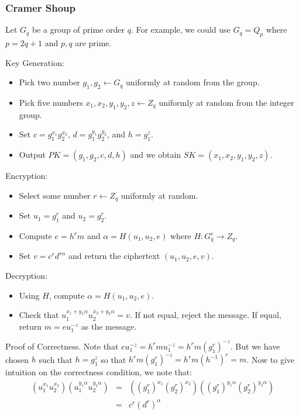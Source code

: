 \documentclass[psamsfonts]{amsart}
\begin{document}
\subsubsection{Cramer Shoup}

Let $G_q$ be a group of prime order $q$. For example, we could use $G_q = Q_p$ where $p = 2q+1$ and $p,q$ are prime.

Key Generation:
\begin{itemize}
  \item Pick two number $g_1, g_2 \leftarrow G_q$ uniformly at random from the group.
  \item Pick five numbers $x_1, x_2, y_1, y_2, z \leftarrow Z_q$ uniformly at random from the integer group.
  \item Set $c = g_1^{x_1} g_2^{x_2}$, $d = g_1^{y_1} g_2^{y_2}$, and $h = g_1^z$.
  \item Output $PK = (g_1, g_2, c, d, h)$ and we obtain $SK = (x_1, x_2, y_1, y_2, z)$.
\end{itemize}

Encryption:
\begin{itemize}
  \item Select some number $r \leftarrow Z_q$ uniformly at random.
  \item Set $u_1 = g_1^{r}$ and $u_2 = g_2^{r}$.
  \item Compute $e = h^r m$ and $\alpha = H(u_1, u_2, e)$ where $H: G_q^{e} \to Z_q$.
  \item Set $v = c^r d^{r \alpha}$ and return the ciphertext $(u_1, u_2, e, v)$.
\end{itemize}

Decryption:
\begin{itemize}
  \item Using $H$, compute $\alpha = H(u_1, u_2, e)$.
  \item Check that $u_1^{x_1 + y_1 \alpha} u_2^{x_2 + y_2 \alpha} = v$. If not equal, reject the message. If equal, return $m = e u_1^{-z}$ as the message.
\end{itemize}

Proof of Correctness. Note that $e u_1^{-z} = h^r m u_1^{-z} = h^r m (g_1^{r})^{-z}$. But we have chosen $h$ such that $h = g_1^z$ so that $h^r m (g_1^{r})^{-z} = h^r m (h^{-1})^r = m$. Now to give intuition on the correctness condition, we note that:
\begin{eqnarray}
  (u_1^{x_1} u_2^{x_2})(u_1^{y_1 \alpha} u_2^{y_2 \alpha}) &=& ((g_1^{r})^{x_1}(g_2^{r})^{x_2})((g_1^{r})^{y_1 \alpha} (g_2^{r})^{y_2 \alpha}) \\
                                                           &=& c^r (d^r)^\alpha
\end{eqnarray}
\end{document}
